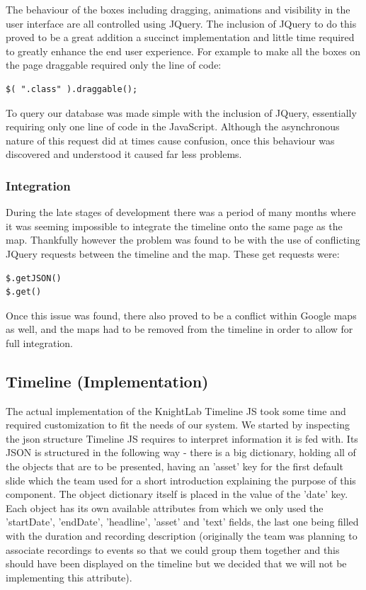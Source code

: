\documentclass{l3proj}
\begin{document}
The behaviour of the boxes including dragging, animations and visibility in the user interface are all controlled using JQuery. The inclusion of JQuery to do this proved to be a great addition a succinct implementation and little time required to greatly enhance the end user experience. For example to make all the boxes on the page draggable required only the line of code:
\begin{verbatim}
$( ".class" ).draggable();
\end{verbatim}
To query our database was made simple with the inclusion of JQuery, essentially requiring only one line of code in the \gls{JavaScript}. Although the asynchronous nature of this request did at times cause confusion, once this behaviour was discovered and understood it caused far less problems.

\subsubsection{Integration}

During the late stages of development there was a period of many months where it was seeming impossible to integrate the timeline onto the same page as the map. Thankfully however the problem was found to be with the use of conflicting JQuery requests between the timeline and the map. These get requests were:
\begin{verbatim}
$.getJSON()
$.get()
\end{verbatim}
Once this issue was found, there also proved to be a conflict within Google maps as well, and the maps had to be removed from the timeline in order to allow for full integration.

\subsection{Timeline (Implementation)}

The actual implementation of the KnightLab Timeline JS took some time and required customization to fit the needs of our system. We started by inspecting the json structure Timeline JS requires to interpret information it is fed with.
Its JSON is structured in the following way - there is a big dictionary, holding all of the objects that are to be presented, having an 'asset' key for the first default slide which the team used for a short introduction explaining the purpose of this component.
The object dictionary itself is placed in the value of the 'date' key. Each object has its own available attributes from which we only used the 'startDate', 'endDate', 'headline', 'asset' and 'text' fields, the last one being filled with the duration and recording description (originally the team was planning to associate recordings to events so that we could group them together and this should have been displayed on the timeline but we decided that we will not be implementing this attribute).
\end{document}
